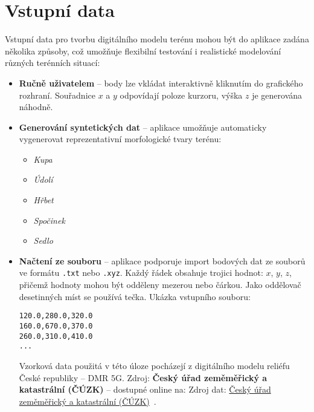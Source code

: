 \section{Vstupní data}

Vstupní data pro tvorbu digitálního modelu terénu mohou být do aplikace zadána několika způsoby, což umožňuje flexibilní testování i realistické modelování různých terénních situací:

\begin{itemize}
    \item \textbf{Ručně uživatelem} – body lze vkládat interaktivně kliknutím do grafického rozhraní. Souřadnice $x$ a $y$ odpovídají poloze kurzoru, výška $z$ je generována náhodně.

    \item \textbf{Generování syntetických dat} – aplikace umožňuje automaticky vygenerovat reprezentativní morfologické tvary terénu:
    \begin{itemize}
        \item \emph{Kupa}
        \item \emph{Údolí}
        \item \emph{Hřbet}
        \item \emph{Spočinek}
        \item \emph{Sedlo}
    \end{itemize}

    \item \textbf{Načtení ze souboru} – aplikace podporuje import bodových dat ze souborů ve formátu \texttt{.txt} nebo \texttt{.xyz}. Každý řádek obsahuje trojici hodnot: $x$, $y$, $z$, přičemž hodnoty mohou být odděleny mezerou nebo čárkou. Jako oddělovač desetinných míst se používá tečka. Ukázka vstupního souboru:

    \begin{verbatim}
120.0,280.0,320.0
160.0,670.0,370.0
260.0,310.0,410.0
...
    \end{verbatim}

Vzorková data použitá v této úloze pocházejí z digitálního modelu reliéfu České republiky – DMR 5G. Zdroj: \textbf{Český úřad zeměměřický a katastrální (ČÚZK)} – dostupné online na: Zdroj dat: \href{https://geoportal.cuzk.cz/}{Český úřad zeměměřický a katastrální (ČÚZK)}~\cite{cuzk}.

\end{itemize}